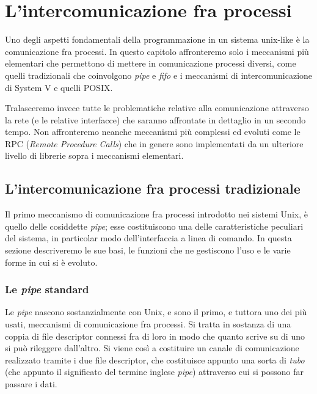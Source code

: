 
\chapter{L'intercomunicazione fra processi}
\label{cha:IPC}


Uno degli aspetti fondamentali della programmazione in un sistema unix-like è
la comunicazione fra processi. In questo capitolo affronteremo solo i
meccanismi più elementari che permettono di mettere in comunicazione processi
diversi, come quelli tradizionali che coinvolgono \textit{pipe} e
\textit{fifo} e i meccanismi di intercomunicazione di System V e quelli POSIX.

Tralasceremo invece tutte le problematiche relative alla comunicazione
attraverso la rete (e le relative interfacce) che saranno affrontate in
dettaglio in un secondo tempo.  Non affronteremo neanche meccanismi più
complessi ed evoluti come le RPC (\textit{Remote Procedure Calls}) che in
genere sono implementati da un ulteriore livello di librerie sopra i
meccanismi elementari.


\section{L'intercomunicazione fra processi tradizionale}
\label{sec:ipc_unix}

Il primo meccanismo di comunicazione fra processi introdotto nei sistemi Unix,
è quello delle cosiddette \textit{pipe}; esse costituiscono una delle
caratteristiche peculiari del sistema, in particolar modo dell'interfaccia a
linea di comando. In questa sezione descriveremo le sue basi, le funzioni che
ne gestiscono l'uso e le varie forme in cui si è evoluto.


\subsection{Le \textit{pipe} standard}
\label{sec:ipc_pipes}

Le \textit{pipe} nascono sostanzialmente con Unix, e sono il primo, e tuttora
uno dei più usati, meccanismi di comunicazione fra processi. Si tratta in
sostanza di una coppia di file descriptor connessi fra di loro in modo che
quanto scrive su di uno si può rileggere dall'altro.  Si viene così a
costituire un canale di comunicazione realizzato tramite i due file
descriptor, che costituisce appunto una sorta di \textsl{tubo} (che appunto il
significato del termine inglese \textit{pipe}) attraverso cui si possono far
passare i dati.

